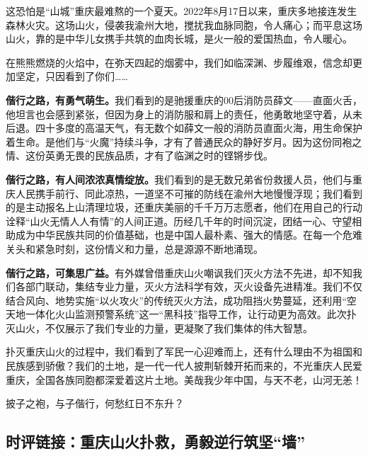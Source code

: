 这恐怕是“山城”重庆最难熬的一个夏天。2022年8月17日以来，重庆多地接连发生森林火灾。这场山火，侵袭我渝州大地，搅扰我血脉同胞，令人痛心；而平息这场山火，靠的是中华儿女携手共筑的血肉长城，是火一般的爱国热血，令人暖心。

在熊熊燃烧的火焰中，在弥天四起的烟雾中，我们如临深渊、步履维艰，信念却更加坚定，只因看到了你们……

\textbf{偕行之路，有勇气萌生。}我们看到的是驰援重庆的00后消防员薛文——直面火舌，他坦言也会感到紧张，但因为身上的消防服和肩上的责任，他勇敢地坚守着，从未后退。四十多度的高温天气，有无数个如薛文一般的消防员直面火海，用生命保护着生命。是他们与“火魔”持续斗争，才有了普通民众的静好岁月。因为这份同袍之情、这份英勇无畏的民族品质，才有了临渊之时的铿锵步伐。

\textbf{偕行之路，有人间浓浓真情绽放。}我们看到的是无数兄弟省份救援人员，他们与重庆人民携手前行、同此凉热，一道坚不可摧的防线在渝州大地慢慢浮现；我们看到的是主动报名上山清理垃圾，还重庆美丽的千千万万志愿者，他们在用自己的行动诠释“山火无情人人有情”的人间正道。历经几千年的时间沉淀，团结一心、守望相助成为中华民族共同的价值基础，也是中国人最朴素、强大的情感。在每一个危难关头和紧急时刻，这份情义和力量，总是源源不断地涌现。

\textbf{偕行之路，可集思广益。}有外媒曾借重庆山火嘲讽我们灭火方法不先进，却不知我们各部门联动，集结专业力量，灭火方法科学有效，灭火设备先进精准。我们不仅结合风向、地势实施“以火攻火”的传统灭火方法，成功阻挡火势蔓延，还利用“空天地一体化火山监测预警系统”这一“黑科技”指导工作，让行动更为高效。此次扑灭山火，不仅展示了我们专业的力量，更凝聚了我们集体的伟大智慧。

扑灭重庆山火的过程中，我们看到了军民一心迎难而上，还有什么理由不为祖国和民族感到骄傲？我们的土地，是一代一代人披荆斩棘开拓而来的，不光重庆人民爱重庆，全国各族同胞都深爱着这片土地。美哉我少年中国，与天不老，山河无恙！

披子之袍，与子偕行，何愁红日不东升？


\subsection*{时评链接：重庆山火扑救，勇毅逆行筑坚“墙”}

